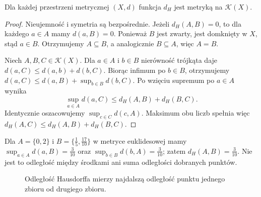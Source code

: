 \begin{twierdzenie}
\label{thm:topog21-hausdorff-metric}
Dla każdej przestrzeni metrycznej \((X,d)\)
funkcja \(d_H\) jest metryką na \(\mathcal K(X)\).
\end{twierdzenie}
\begin{proof}
Nieujemność i symetria są bezpośrednie.
Jeżeli \(d_H(A,B)=0\), to dla każdego \(a\in A\)
mamy \(d(a,B)=0\). Ponieważ \(B\) jest zwarty,
jest domknięty w \(X\), stąd \(a\in B\).
Otrzymujemy \(A\subseteq B\), a analogicznie
\(B\subseteq A\), więc \(A=B\).

Niech \(A,B,C\in\mathcal K(X)\).
Dla \(a\in A\) i \(b\in B\) nierówność trójkąta
daje \(d(a,C)\le d(a,b)+d(b,C)\).
Biorąc infimum po \(b\in B\), otrzymujemy
\(d(a,C)\le d(a,B)+\sup_{b\in B}d(b,C)\).
Po wzięciu supremum po \(a\in A\) wynika
\[
 \sup_{a\in A}d(a,C)
 \le d_H(A,B)+d_H(B,C).
\]
Identycznie oszacowujemy \(\sup_{c\in C}d(c,A)\).
Maksimum obu liczb spełnia więc
\(d_H(A,C)\le d_H(A,B)+d_H(B,C)\).
\end{proof}

\begin{przyklad}
\label{ex:topog21-points}
Dla \(A=\{0,2\}\) i
\(B=\{\frac15,\frac{17}{10}\}\)
w metryce euklidesowej mamy
\(\sup_{a\in A}d(a,B)=\frac3{10}\) oraz
\(\sup_{b\in B}d(b,A)=\frac3{10}\);
zatem \(d_H(A,B)=\frac3{10}\).
Nie jest to odległość między środkami
ani suma odległości dobranych punktów.
\begin{figure}[htbp]
\centering
{}
\caption{Odległość Hausdorffa mierzy najdalszą odległość
punktu jednego zbioru od drugiego zbioru.}
\label{fig:topog21-points}
\end{figure}
\end{przyklad}

